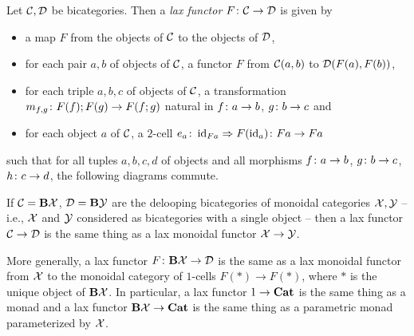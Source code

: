 \documentclass{article}
\begin{document}
\begin{definition}
  Let ${\mathcal{C}},{\mathcal{D}}$ be bicategories.  
  Then a \emph{lax functor} $F\colon{\mathcal{C}} \to {\mathcal{D}}$ is given by
  \begin{itemize}
    \item a map $F$ from the objects of ${\mathcal{C}}$ to the objects of ${\mathcal{D}}$,
    \item for each pair $a,b$ of objects of ${\mathcal{C}}$, a functor $F$ from ${\mathcal{C}}(a,b)$ to ${\mathcal{D}}(F(a),F(b))$,
    \item for each triple $a,b,c$ of objects of ${\mathcal{C}}$, a transformation $m_{f,g}\colon F(f);F(g) \to F(f;g)$ natural in $f\colon a \to b$, $g\colon b \to c$ and
    \item for each object $a$ of ${\mathcal{C}}$, a $2$-cell $e_a\colon \operatorname{id}_{Fa} \Rightarrow F(\operatorname{id}_a)\colon Fa \to Fa$
  \end{itemize}
  such that for all tuples $a,b,c,d$ of objects and all morphisms $f\colon a \to b$, $g\colon b \to c$, $h \colon c \to d$, the following diagrams commute.
\end{definition}
\begin{example}
  If ${\mathcal{C}} = \mathbf B \mathcal X$, ${\mathcal{D}} = \mathbf B \mathcal Y$ are the delooping bicategories of monoidal categories $\mathcal X, \mathcal Y$ -- i.e., $\mathcal X$ and $\mathcal Y$ considered as bicategories with a single object -- then a lax functor ${\mathcal{C}} \to {\mathcal{D}}$ is the same thing as a lax monoidal functor $\mathcal X \to \mathcal Y$.  

  More generally, a lax functor $F\colon \mathbf B \mathcal X \to {\mathcal{D}}$ is the same as a lax monoidal functor from $\mathcal X$ to the monoidal category of $1$-cells $F(*) \to F(*)$, where $*$ is the unique object of $\mathbf B\mathcal X$.  
  In particular, a lax functor $1\to {\normalfont\textbf{Cat}}$ is the same thing as a monad and a lax functor $\mathbf B\mathcal X \to {\normalfont\textbf{Cat}}$ is the same thing as a parametric monad parameterized by $\mathcal X$.
\end{example}
\end{document}
